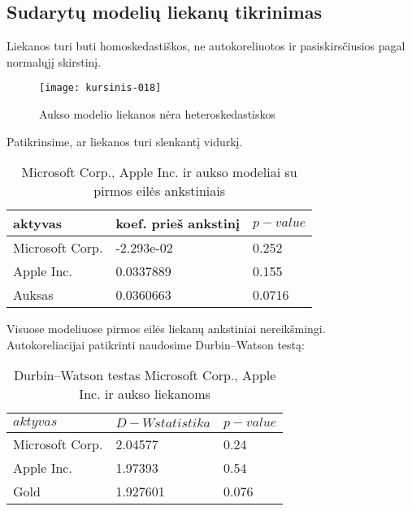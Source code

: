 \documentclass[12pt, a14paper, lithuanian]{article}
\begin{document}
\subsection{Sudarytų modelių liekanų tikrinimas}

Liekanos turi buti homoskedastiškos, ne autokoreliuotos ir pasiskirsčiusios pagal normalųjį skirstinį.

\begin{figure}[H]
  \centering
\texttt{[image: kursinis-018]}
  \caption{Aukso modelio liekanos nėra heteroskedastiskos}
  \label{fig:10}
\end{figure}


Patikrinsime, ar liekanos turi slenkantį vidurkį.

\begin{table}[ht]
\begin{center}
    \begin{tabular}{ | l | l | l | }
    \hline
    aktyvas  &  koef. prieš ankstinį  & $ p-value $  \\
    \hline
	Microsoft Corp. & -2.293e-02 & 0.252\\
	Apple Inc. & 0.0337889 &  0.155\\
	Auksas & 0.0360663 &  0.0716\\
	\hline
    \end{tabular}
\end{center}
\caption{Microsoft Corp., Apple Inc. ir aukso modeliai su pirmos eilės ankstiniais}
\end{table}

Visuose modeliuose pirmos eilės liekanų ankstiniai nereikšmingi.\\

Autokoreliacijai patikrinti naudosime Durbin--Watson testą:



\begin{table}[ht]
\begin{center}
    \begin{tabular}{ | l | l | l | }
    \hline
    $ aktyvas $ & $ D-W statistika $ & $ p-value $  \\
    \hline
	Microsoft Corp. & 2.04577 &  0.24\\
	Apple Inc. & 1.97393 &  0.54\\
	Gold & 1.927601 &  0.076\\
	\hline
    \end{tabular}
\end{center}
\caption{Durbin--Watson testas Microsoft Corp., Apple Inc. ir aukso liekanoms}
\end{table}
\end{document}
